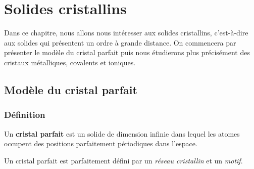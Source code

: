 \documentclass{cours}
\begin{document}
\setcounter{chapter}{21}
\chapter{Solides cristallins}

Dans ce chapitre, nous allons nous intéresser aux solides cristallins, c'est-à-dire aux solides qui présentent un ordre à grande distance. On commencera par présenter le modèle du cristal parfait puis nous étudierons plus précisément des cristaux métalliques, covalents et ioniques.
    
\section{Modèle du cristal parfait}%
\label{sec:modele_du_cristal_parfait}

\subsection{Définition}%
\label{sub:definition}
\begin{definition}
  Un \textbf{cristal parfait} est un solide de dimension infinie dans lequel les atomes occupent des positions parfaitement périodiques dans l'espace.
\end{definition}

Un cristal parfait est parfaitement défini par un \emph{réseau cristallin} et un \emph{motif}.   
\end{document}

